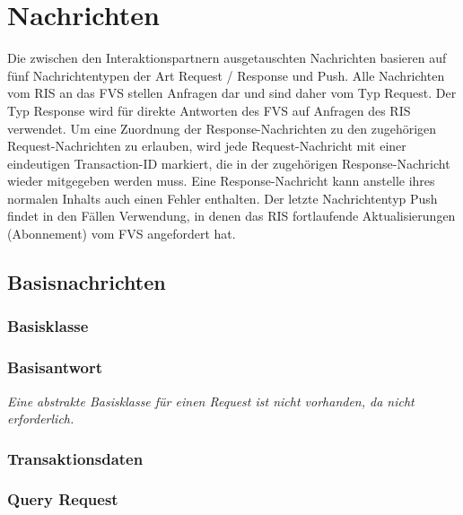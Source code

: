 \chapter{Nachrichten}
\label{cha:Nachrichten}
Die zwischen den Interaktionspartnern ausgetauschten Nachrichten basieren auf fünf Nachrichtentypen der Art Request / Response und Push. Alle Nachrichten vom RIS an das FVS stellen Anfragen dar und sind daher vom Typ Request. Der Typ Response wird für direkte Antworten des FVS auf Anfragen des RIS verwendet. Um eine Zuordnung der Response-Nachrichten zu den zugehörigen Request-Nachrichten zu erlauben, wird jede Request-Nachricht mit einer eindeutigen Transaction-ID markiert, die in der zugehörigen Response-Nachricht wieder mitgegeben werden muss. Eine Response-Nachricht kann anstelle ihres normalen Inhalts auch einen Fehler enthalten. Der letzte Nachrichtentyp Push findet in den Fällen Verwendung, in denen das RIS fortlaufende Aktualisierungen (Abonnement) vom FVS angefordert hat.

\section{Basisnachrichten}
\label{sec:Nachrichten:Basisnachrichten}

\subsection*{Basisklasse}



\subsection*{Basisantwort}


\medskip

\textit{Eine abstrakte Basisklasse für einen Request ist nicht vorhanden, da nicht erforderlich.}

\subsection*{Transaktionsdaten}



\subsection*{Query Request}




